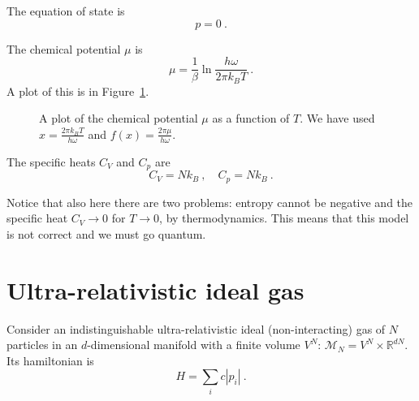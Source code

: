     The equation of state is 
    \begin{equation*}
        p = 0 ~.
    \end{equation*}
    
    The chemical potential $\mu$ is 
    \begin{equation*}
        \mu = \frac{1}{\beta} \ln \frac{h \omega}{2 \pi k_B T} ~.
    \end{equation*}
    A plot of this is in Figure~\ref{can:mu2}.
    \begin{figure}[h!]
        \centering
        \caption{A plot of the chemical potential $\mu$ as a function of $T$. We have used $x = \frac{2 \pi k_B T}{h \omega}$ and $f(x) = \frac{2 \pi \mu}{h \omega}$.}
        \label{can:mu2}
    \end{figure}

    The specific heats $C_V$ and $C_p$ are 
    \begin{equation*}
        C_V = N k_B  ~, \quad C_p = N k_B ~. 
    \end{equation*}

    Notice that also here there are two problems: entropy cannot be negative and the specific heat $C_V \rightarrow 0$ for $T \rightarrow 0$, by thermodynamics. This means that this model is not correct and we must go quantum.

\section{Ultra-relativistic ideal gas}

    Consider an indistinguishable ultra-relativistic ideal (non-interacting) gas of $N$ particles in an $d$-dimensional manifold with a finite volume $V^N$: $\mathcal M_N = V^N \times \mathbb R^{dN}$. Its hamiltonian is 
    \begin{equation*}
        H = \sum_i c |p_i| ~.
    \end{equation*}

